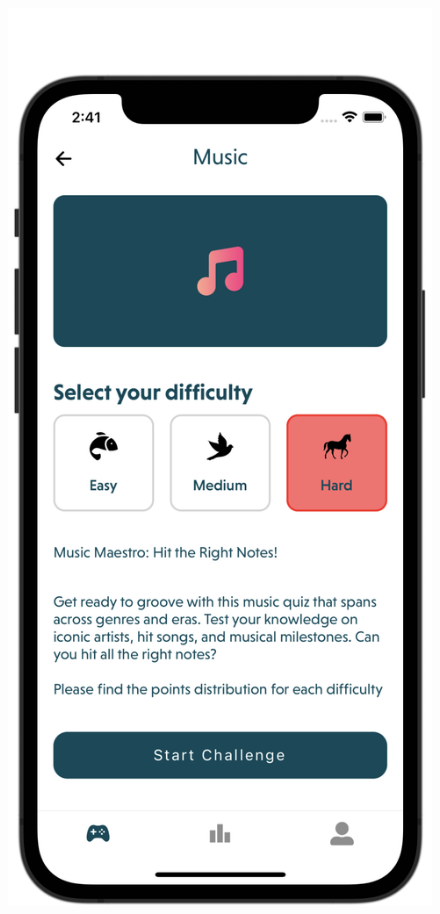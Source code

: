 \begin{figure}[H]
    \centering
    \begin{minipage}[b]{0.43\linewidth}
        \centering
        \includegraphics[width=\linewidth]{Mobile UI/Hard Level Quiz.png}

\end{minipage}
\end{figure}
